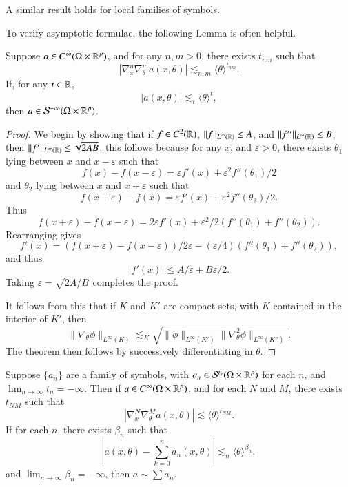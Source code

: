 \begin{remark}
    A similar result holds for local families of symbols.
\end{remark}

To verify asymptotic formulae, the following Lemma is often helpful.

\begin{lemma}
    Suppose $a \in C^\infty(\Omega \times \operatorname{\mathbb{R}}^p)$, and for any $n,m > 0$, there exists $t_{nm}$ such that
    \[ |\nabla^n_x \nabla^m_\theta a(x,\theta)| \lesssim_{n,m} \langle \theta \rangle^{t_{nm}}. \]
    If, for any $t \in \operatorname{\mathbb{R}}$,
    \[ |a(x,\theta)| \lesssim_t \langle \theta \rangle^t, \]
    then $a \in \mathcal{S}^{-\infty}(\Omega \times \operatorname{\mathbb{R}}^p)$.
\end{lemma}
\begin{proof}
    We begin by showing that if $f \in C^2(\operatorname{\mathbb{R}})$, $\| f \|_{L^\infty(\operatorname{\mathbb{R}})} \leq A$, and $\| f'' \|_{L^\infty(\operatorname{\mathbb{R}})} \leq B$, then $\| f' \|_{L^\infty(\operatorname{\mathbb{R}})} \leq \sqrt{2AB}$. this follows because for any $x$, and $\varepsilon > 0$, there exists $\theta_1$ lying between $x$ and $x - \varepsilon$ such that
    \[ f(x) - f(x-\varepsilon) = \varepsilon f'(x) + \varepsilon^2 f''(\theta_1) / 2 \]
    and $\theta_2$ lying between $x$ and $x + \varepsilon$ such that
    \[ f(x + \varepsilon) - f(x) = \varepsilon f'(x) + \varepsilon^2 f''(\theta_2)/2. \]
    Thus
    \[ f(x+\varepsilon) - f(x-\varepsilon) = 2 \varepsilon f'(x) + \varepsilon^2 / 2 (f''(\theta_1) + f''(\theta_2)). \]
    Rearranging gives
    \[ f'(x) = (f(x+\varepsilon) - f(x-\varepsilon))/2 \varepsilon - (\varepsilon / 4)(f''(\theta_1) + f''(\theta_2)), \]
    and thus
    \[ |f'(x)| \leq A/\varepsilon + B \varepsilon / 2. \]
    Taking $\varepsilon = \sqrt{2A/B}$ completes the proof.

    It follows from this that if $K$ and $K'$ are compact sets, with $K$ contained in the interior of $K'$, then
    \[ \| \nabla_\theta \phi \|_{L^\infty(K)} \lesssim_K \sqrt{\| \phi \|_{L^\infty(K')} \| \nabla_\theta^2 \phi \|_{L^\infty(K'')} }. \]
    The theorem then follows by successively differentiating in $\theta$.
\end{proof}

\begin{corollary}
    Suppose $\{ a_n \}$ are a family of symbols, with $a_n \in \mathcal{S}^{t_n}(\Omega \times \operatorname{\mathbb{R}}^p)$ for each $n$, and $\lim_{n \to \infty} t_n = -\infty$. Then if $a \in C^\infty(\Omega \times \operatorname{\mathbb{R}}^p)$, and for each $N$ and $M$, there exists $t_{NM}$ such that
    \[ |\nabla^N_x \nabla^M_\theta a(x,\theta)| \lesssim \langle \theta \rangle^{t_{NM}}. \]
    If for each $n$, there exists $\beta_n$ such that
    \[ |a(x,\theta) - \sum_{k = 0}^n a_n(x,\theta)| \lesssim_n \langle \theta \rangle^{\beta_n}, \]
    and $\lim_{n \to \infty} \beta_n = -\infty$, then $a \sim \sum a_n$.
\end{corollary}

